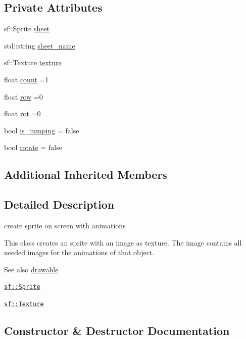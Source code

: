 \subsection*{Private Attributes}
\begin{DoxyCompactItemize}
\item 
sf\+::\+Sprite \hyperlink{classanimation_aa72ba079cfcb62b5dd7f6d74a9438516}{sheet}
\item 
std\+::string \hyperlink{classanimation_a5406569ef9a8e47a8e50a927063613f6}{sheet\+\_\+name}
\item 
sf\+::\+Texture \hyperlink{classanimation_a9b49e5a7b856d127ea5481998c911fde}{texture}
\item 
float \hyperlink{classanimation_a50dde9518af0631ff1b86881a0e4c0ce}{count} =1
\item 
float \hyperlink{classanimation_adaa2321a124fb03b2f4b3bd7af4e2127}{row} =0
\item 
float \hyperlink{classanimation_a9a1d350886939f9e988d2786ca9709e7}{rot} =0
\item 
bool \hyperlink{classanimation_a8365683c0efa023b2bcb60b3fde9eeb2}{is\+\_\+jumping} = false
\item 
bool \hyperlink{classanimation_a48077a46bbac0719c0a8227456620e14}{rotate} = false
\end{DoxyCompactItemize}
\subsection*{Additional Inherited Members}


\subsection{Detailed Description}
create sprite on screen with animations 

This class creates an sprite with an image as texture. The image contains all needed images for the animations of that object.

\begin{DoxySeeAlso}{See also}
\hyperlink{classdrawable}{drawable} 

\href{https://www.sfml-dev.org/documentation/2.0/classsf_1_1Sprite.php }{\tt sf\+::\+Sprite} 

\href{https://www.sfml-dev.org/documentation/2.0/classsf_1_1Texture.php}{\tt sf\+::\+Texture} 
\end{DoxySeeAlso}


\subsection{Constructor \& Destructor Documentation}
\mbox{\label{classanimation_ab0a44a89f36d6f04c4e21e868441d693}} 
